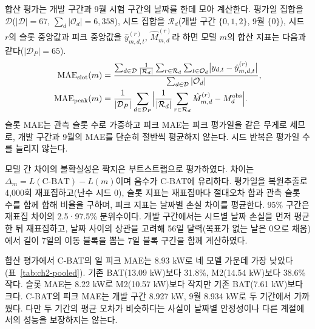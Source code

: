합산 평가는 개발 구간과 9월 시험 구간의 날짜를 한데 모아 계산한다. 평가일 집합을 $\mathcal D$($|\mathcal D|=67$, $\sum_d|\mathcal O_d|=6{,}358$), 시드 집합을 $\mathcal R_d$(개발 구간 $\{0,1,2\}$, 9월 $\{0\}$), 시드 $r$의 슬롯 중앙값과 피크 중앙값을 $\hat y^{(r)}_{m,d,t}$, $\hat M^{(r)}_{m,d}$라 하면 모델 $m$의 합산 지표는 다음과 같다($|\mathcal D_P|=65$).
\begin{equation}
\begin{split}
\mathrm{MAE}_{\mathrm{slot}}(m) &= \frac{\sum_{d\in\mathcal D}\frac1{|\mathcal R_d|}\sum_{r\in\mathcal R_d}\sum_{t\in\mathcal O_d}\bigl|y_{d,t}-\hat y^{(r)}_{m,d,t}\bigr|}{\sum_{d\in\mathcal D}|\mathcal O_d|},\\
\mathrm{MAE}_{\mathrm{peak}}(m) &= \frac1{|\mathcal D_P|}\sum_{d\in\mathcal D_P}\Bigl|\frac1{|\mathcal R_d|}\sum_{r\in\mathcal R_d}\hat M^{(r)}_{m,d}-M^{\mathrm{obs}}_d\Bigr|.
\end{split}
\label{eq:ch2-pooled}
\end{equation}
슬롯 MAE는 관측 슬롯 수로 가중하고 피크 MAE는 피크 평가일을 같은 무게로 세므로, 개발 구간과 9월의 MAE를 단순히 절반씩 평균하지 않는다. 시드 반복은 평가일 수를 늘리지 않는다.

모델 간 차이의 불확실성은 짝지은 부트스트랩으로 평가하였다. 차이는 $\Delta_{m}=L(\text{C-BAT})-L(m)$이며 음수가 C-BAT에 유리하다. 평가일을 복원추출로 4,000회 재표집하고(난수 시드 0), 슬롯 지표는 재표집마다 절대오차 합과 관측 슬롯 수를 함께 합해 비율을 구하며, 피크 지표는 날짜별 손실 차이를 평균한다. 95\% 구간은 재표집 차이의 2.5·97.5\% 분위수이다. 개발 구간에서는 시드별 날짜 손실을 먼저 평균한 뒤 재표집하고, 날짜 사이의 상관을 고려해 56일 달력(목표가 없는 날은 0으로 채움)에서 길이 7일의 이동 블록을 뽑는 7일 블록 구간을 함께 계산하였다.


합산 평가에서 C-BAT의 일 피크 MAE는 8.93 kW로 네 모델 가운데 가장 낮았다(표~\ref{tab:ch2-pooled}). 기존 BAT(13.09 kW)보다 31.8\%, M2(14.54 kW)보다 38.6\% 작다. 슬롯 MAE는 8.22 kW로 M2(10.57 kW)보다 작지만 기존 BAT(7.61 kW)보다 크다. C-BAT의 피크 MAE는 개발 구간 8.927 kW, 9월 8.934 kW로 두 기간에서 가까웠다. 다만 두 기간의 평균 오차가 비슷하다는 사실이 날짜별 안정성이나 다른 계절에서의 성능을 보장하지는 않는다.

